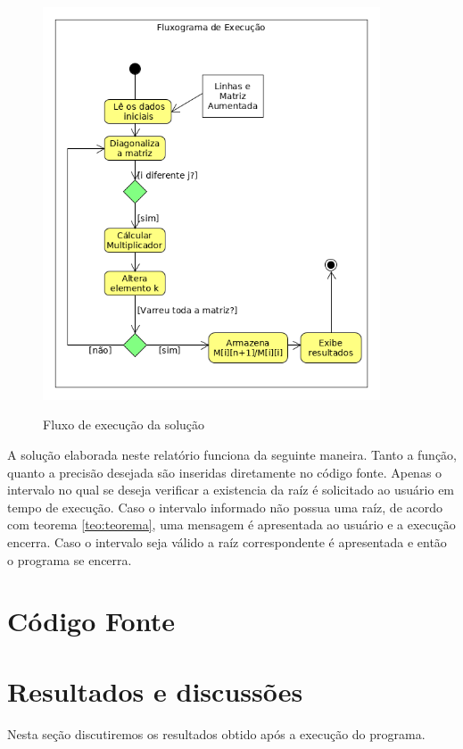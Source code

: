 \documentclass[12pt, hidelinks]{article}
\begin{document}
\begin{figure}[!h]
  \centering
  \includegraphics[width=10cm]{figuras/fluxograma.png}\\
  \caption{Fluxo de execução da solução}\label{fig:fluxo}
\end{figure}

A solução elaborada neste relatório funciona da seguinte maneira. Tanto a função, quanto a precisão desejada são inseridas diretamente no código fonte. Apenas o intervalo no qual se deseja verificar a existencia da raíz é solicitado ao usuário em tempo de execução. Caso o intervalo informado não possua uma raíz, de acordo com teorema \ref{teo:teorema}, uma mensagem é apresentada ao usuário e a execução encerra. Caso o intervalo seja válido a raíz correspondente é apresentada e então o programa se encerra.

\newpage
\section{Código Fonte}



\newpage
\section{Resultados e discussões}

Nesta seção discutiremos os resultados obtido após a execução do programa.
\end{document}
